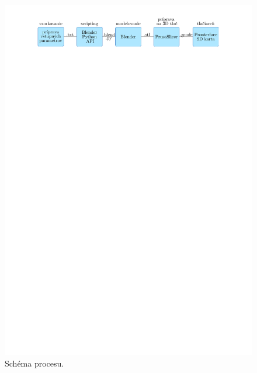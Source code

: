 \begin{figure}[h]
	\centering
	\includegraphics[trim={2.8cm 26cm 0cm 1cm},clip]{images/pipeline3.pdf}
	\caption[Schéma procesu od vstupu až po výstup.]{Schéma procesu.}
	\label{fig:pipeline}
\end{figure}
